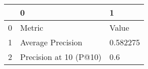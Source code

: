 \begin{tabular}{lll}
\toprule
{} &                       0 &         1 \\
\midrule
0 &                  Metric &     Value \\
1 &       Average Precision &  0.582275 \\
2 &  Precision at 10 (P@10) &       0.6 \\
\bottomrule
\end{tabular}
